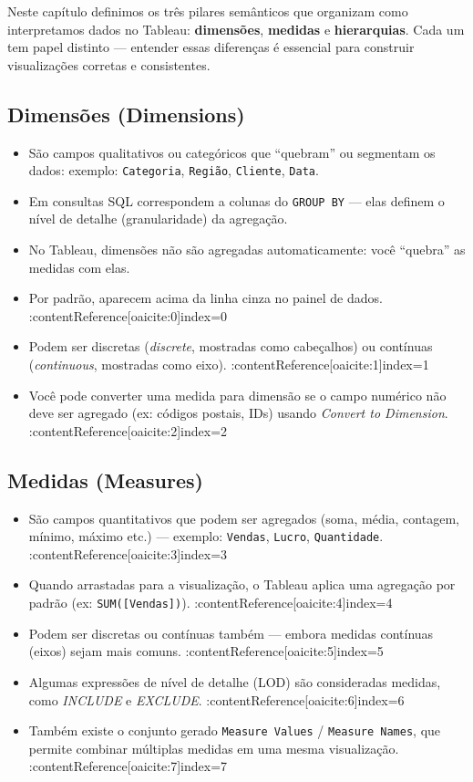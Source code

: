 Neste capítulo definimos os três pilares semânticos que organizam como interpretamos dados no Tableau: \textbf{dimensões}, \textbf{medidas} e \textbf{hierarquias}. Cada um tem papel distinto — entender essas diferenças é essencial para construir visualizações corretas e consistentes.

\subsection*{Dimensões (Dimensions)}

\begin{itemize}[leftmargin=*]
  \item São campos qualitativos ou categóricos que “quebram” ou segmentam os dados: exemplo: \texttt{Categoria}, \texttt{Região}, \texttt{Cliente}, \texttt{Data}.  
  \item Em consultas SQL correspondem a colunas do \texttt{GROUP BY} — elas definem o nível de detalhe (granularidade) da agregação.  
  \item No Tableau, dimensões não são agregadas automaticamente: você “quebra” as medidas com elas.  
  \item Por padrão, aparecem acima da linha cinza no painel de dados. :contentReference[oaicite:0]{index=0}  
  \item Podem ser discretas (\textit{discrete}, mostradas como cabeçalhos) ou contínuas (\textit{continuous}, mostradas como eixo). :contentReference[oaicite:1]{index=1}  
  \item Você pode converter uma medida para dimensão se o campo numérico não deve ser agregado (ex: códigos postais, IDs) usando \textit{Convert to Dimension}. :contentReference[oaicite:2]{index=2}  
\end{itemize}

\subsection*{Medidas (Measures)}

\begin{itemize}[leftmargin=*]
  \item São campos quantitativos que podem ser agregados (soma, média, contagem, mínimo, máximo etc.) — exemplo: \texttt{Vendas}, \texttt{Lucro}, \texttt{Quantidade}. :contentReference[oaicite:3]{index=3}  
  \item Quando arrastadas para a visualização, o Tableau aplica uma agregação por padrão (ex: \texttt{SUM([Vendas])}). :contentReference[oaicite:4]{index=4}  
  \item Podem ser discretas ou contínuas também — embora medidas contínuas (eixos) sejam mais comuns. :contentReference[oaicite:5]{index=5}  
  \item Algumas expressões de nível de detalhe (LOD) são consideradas medidas, como \textit{INCLUDE} e \textit{EXCLUDE}. :contentReference[oaicite:6]{index=6}  
  \item Também existe o conjunto gerado \texttt{Measure Values} / \texttt{Measure Names}, que permite combinar múltiplas medidas em uma mesma visualização. :contentReference[oaicite:7]{index=7}  
\end{itemize}

